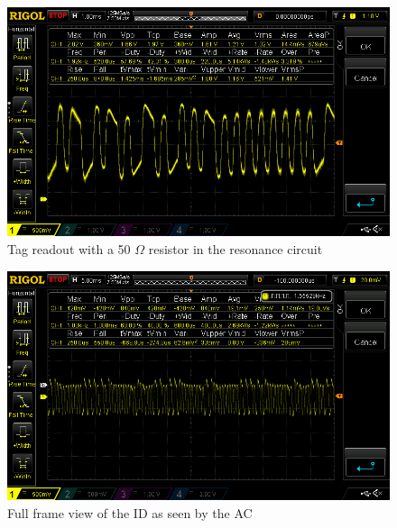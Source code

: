 \begin{figure}
    \centering
    \includegraphics[width=\textwidth]{06_My_Testing_Results/figures/RFID_signal_with_different_resistance/50OHM.png}
    \caption{Tag readout with a 50 $\Omega$ resistor in the resonance circuit}
    \label{fig:06:TagReadout50Ohm}
\end{figure}

\begin{figure}
    \centering
    \includegraphics[width=\textwidth]{06_My_Testing_Results/figures/RFID_signal_with_different_resistance/Full_RFID_frame.png}
    \caption{Full frame view of the ID as seen by the AC}
    \label{fig:06:fullID}
\end{figure}


